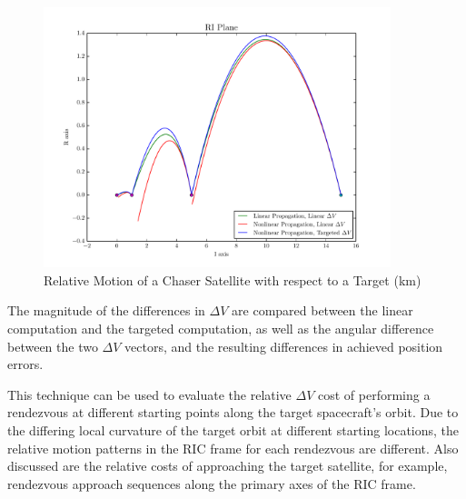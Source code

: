 \documentclass[a4paper]{article}
\begin{document}
\begin{figure}[h] 
	\begin{center}
		\includegraphics[width=0.9\textwidth]{RIC_1}
		\caption{Relative Motion of a Chaser Satellite with respect to a Target (km)}
		\label{fig:RIC_1}
	\end{center}
\end{figure} %

The magnitude of the differences in \(\Delta V\) are compared between the linear computation and the targeted computation, as well as the angular difference between the two \(\Delta V\) vectors, and the resulting differences in achieved position errors.

This technique can be used to evaluate the relative \(\Delta V\) cost of performing a rendezvous at different starting points along the target spacecraft's orbit.  Due to the differing local curvature of the target orbit at different starting locations, the relative motion patterns in the RIC frame for each rendezvous are different. Also discussed are the relative costs of approaching the target satellite, for example, rendezvous approach sequences along the primary axes of the RIC frame.

\clearpage



\end{document}
